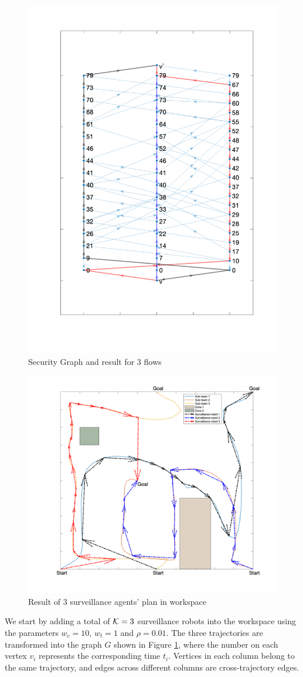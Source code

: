 \documentclass[journal]{IEEEtran}  %
\begin{document}
\begin{figure}[t]
\begin{center}
\includegraphics[width=0.4\linewidth]{graph_flow_result_3}
\caption{Security Graph and result for 3 flows}
\label{fig:security-graph-3-flow}
\end{center}
\end{figure}

\begin{figure}[htbp]
\begin{center}
\includegraphics[width=0.6\linewidth]{3_flow_result}
\caption{Result of 3 surveillance agents' plan in workspace}
\label{fig:workspace-3-flow}
\end{center}
\end{figure}

We start by adding a total of $\mathcal{K}=3$ surveillance robots into the workspace using the parameters $w_{c}=10$, $w_{t}=1$ and $\rho = 0.01$. The three trajectories are transformed into the graph $G$ shown in Figure \ref{fig:security-graph-3-flow}, where the number on each vertex $v_{i}$ represents the corresponding time $t_{i}$. Vertices in each column belong to the same trajectory, and edges across different columns are cross-trajectory edges. 
\end{document}
